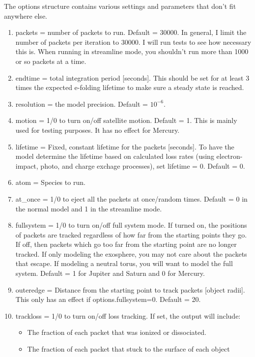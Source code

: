 \documentclass[11pt]{article}
\begin{document}
The options structure contains various settings and parameters that don't fit
anywhere else. 

\begin{enumerate}
\item {\color{red}packets} = number of packets to run. Default = 30000. In
general, I limit the number of packets per iteration to 30000. I will run tests
to see how necessary this is. When running in streamline mode, you shouldn't
run more than 1000 or so packets at a time.
\item endtime = total integration period [seconds]. This should be set for at
least 3 times the expected e-folding lifetime to make sure a steady state is
reached.
\item {\color{red}resolution} = the model precision. Default = $10^{-6}$. 
\item {\color{red}motion} = 1/0 to turn on/off satellite motion. Default = 1.
This is mainly used for testing purposes. It has no effect for Mercury.
\item {\color{red}lifetime} = Fixed, constant lifetime for the packets
[seconds]. To have the model determine the lifetime based on calculated
loss rates (using electron-impact, photo, and charge exchage processes), set
lifetime = 0. Default = 0.
\item atom = Species to run. 
\item {\color{red}at\_once} = 1/0 to eject all the packets at once/random
times. Default = 0 in the normal model and 1 in the streamline mode.
\item {\color{red}fullsystem} = 1/0 to turn on/off full system mode. If turned
on, the positions of packets are tracked regardless of how far from the
starting points they go. If off, then packets which go too far from the
starting point are no longer tracked. If only modeling the exosphere, you may
not care about the packets that escape. If modeling a neutral torus, you will
want to model the full system. Default = 1 for Jupiter and Saturn and 0 for
Mercury.
\item {\color{red}outeredge} = Distance from the starting point to track packets
[object radii]. This only has an effect if options.fullsystem=0. Default = 20.
\item {\color{red}trackloss} = 1/0 to turn on/off loss tracking.
If set, the output will include: 
  \begin{itemize}
  \item The fraction of each packet that was ionized or dissociated.
  \item The fraction of each packet that stuck to the surface of each object

\end{itemize}
\end{enumerate}
\end{document}

